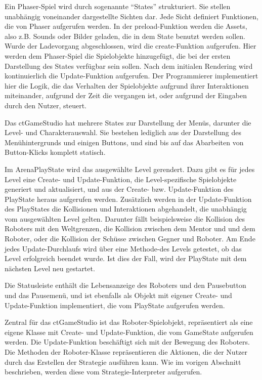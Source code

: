 Ein Phaser-Spiel wird durch sogenannte \enquote{States} strukturiert. Sie stellen unabhängig
voneinander dargestellte Sichten dar. Jede Sicht definiert Funktionen, die von Phaser aufgerufen
werden. In der preload-Funktion werden die Assets, also z.B. Sounds oder Bilder geladen, die in dem
State benutzt werden sollen. Wurde der Ladevorgang abgeschlossen, wird die create-Funktion
aufgerufen. Hier werden dem Phaser-Spiel die Spielobjekte hinzugefügt, die bei der ersten
Darstellung des States verfügbar sein sollen. Nach dem initialen Rendering wird kontinuierlich die
Update-Funktion aufgerufen. Der Programmierer implementiert hier die Logik, die das Verhalten der
Spielobjekte aufgrund ihrer Interaktionen miteinander, aufgrund der Zeit die vergangen ist, oder
aufgrund der Eingaben durch den Nutzer, steuert.

Das ctGameStudio hat mehrere States zur Darstellung der Menüs, darunter die Level- und
Charakterauswahl. Sie bestehen lediglich aus der Darstellung des Menühintergrunds und einigen
Buttons, und sind bis auf das Abarbeiten von Button-Klicks komplett statisch.

Im ArenaPlayState wird das ausgewählte Level gerendert. Dazu gibt es für jedes Level eine Create-
und Update-Funktion, die Level-spezifische Spielobjekte generiert und aktualisiert, und aus der
Create- bzw. Update-Funktion des PlayState heraus aufgerufen werden. Zusätzlich werden in der
Update-Funktion des PlayStates die Kollisionen und Interaktionen abgehandelt, die unabhängig vom
ausgewählten Level gelten. Darunter fällt beispielsweise die Kollision des Roboters mit den
Weltgrenzen, die Kollision zwischen dem Mentor und und dem Roboter, oder die Kollision der Schüsse
zwischen Gegner und Roboter. Am Ende jedes Update-Durchlaufs wird über eine Methode-des Levels
getestet, ob das Level erfolgreich beendet wurde. Ist dies der Fall, wird der PlayState mit dem
nächsten Level neu gestartet.

Die Statusleiste enthält die Lebensanzeige des Roboters und den Pausebutton und das Pausemenü, und
ist ebenfalls als Objekt mit eigener Create- und Update-Funktion implementiert, die vom PlayState
aufgerufen werden.

Zentral für das ctGameStudio ist das Roboter-Spielobjekt, repräsentiert als eine eigene Klasse mit
Create- und Update-Funktion, die vom GameState aufgerufen werden. Die Update-Funktion beschäftigt
sich mit der Bewegung des Roboters. Die Methoden der Roboter-Klasse repräsentieren die Aktionen, die
der Nutzer durch das Erstellen der Strategie ausführen kann. Wie im vorigen Abschnitt beschrieben,
werden diese vom Strategie-Interpreter aufgerufen.


